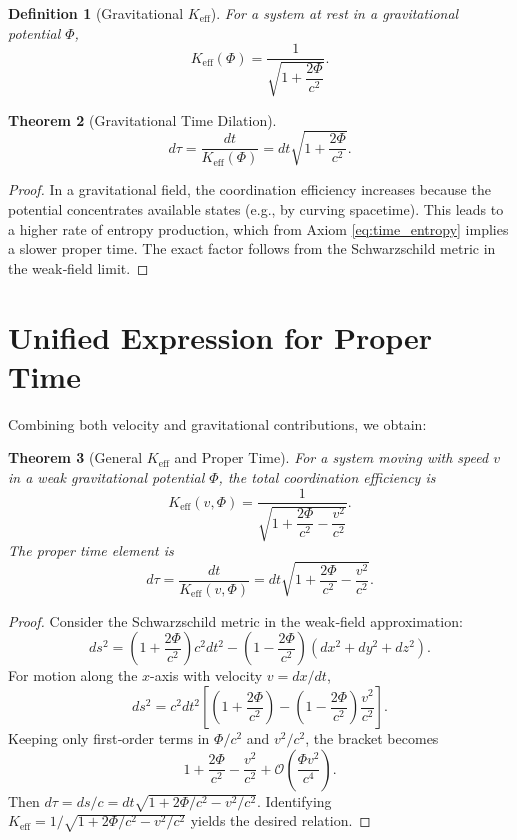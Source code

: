 \documentclass[12pt,a4paper]{article}
\newtheorem{theorem}{Theorem}[section]
\newtheorem{definition}[theorem]{Definition}
\newcommand{\Keff}{K_{\mathrm{eff}}}
\begin{document}
	\begin{definition}[Gravitational \(\Keff\)]
		For a system at rest in a gravitational potential \(\Phi\),
		\[
		\Keff(\Phi) = \frac{1}{\sqrt{1 + \dfrac{2\Phi}{c^2}}}.
		\]
	\end{definition}
	
	\begin{theorem}[Gravitational Time Dilation]
		\begin{equation}
			d\tau = \frac{dt}{\Keff(\Phi)} = dt\sqrt{1 + \frac{2\Phi}{c^2}}.
		\end{equation}
	\end{theorem}
	
	\begin{proof}
		In a gravitational field, the coordination efficiency increases because the potential concentrates available states (e.g., by curving spacetime). This leads to a higher rate of entropy production, which from Axiom \ref{eq:time_entropy} implies a slower proper time. The exact factor follows from the Schwarzschild metric in the weak‑field limit.
	\end{proof}
	
	\section{Unified Expression for Proper Time}
	\label{sec:unified}
	
	Combining both velocity and gravitational contributions, we obtain:
	
	\begin{theorem}[General \(\Keff\) and Proper Time]
		For a system moving with speed \(v\) in a weak gravitational potential \(\Phi\), the total coordination efficiency is
		\begin{equation}
			\Keff(v,\Phi) = \frac{1}{\sqrt{1 + \dfrac{2\Phi}{c^2} - \dfrac{v^2}{c^2}}}.
		\end{equation}
		The proper time element is
		\begin{equation}
			d\tau = \frac{dt}{\Keff(v,\Phi)} = dt\sqrt{1 + \frac{2\Phi}{c^2} - \frac{v^2}{c^2}}.
		\end{equation}
	\end{theorem}
	
	\begin{proof}
		Consider the Schwarzschild metric in the weak‑field approximation:
		\[
		ds^2 = \left(1+\frac{2\Phi}{c^2}\right)c^2 dt^2 - \left(1-\frac{2\Phi}{c^2}\right)(dx^2+dy^2+dz^2).
		\]
		For motion along the \(x\)-axis with velocity \(v = dx/dt\),
		\[
		ds^2 = c^2 dt^2\left[ \left(1+\frac{2\Phi}{c^2}\right) - \left(1-\frac{2\Phi}{c^2}\right)\frac{v^2}{c^2} \right].
		\]
		Keeping only first‑order terms in \(\Phi/c^2\) and \(v^2/c^2\), the bracket becomes
		\[
		1 + \frac{2\Phi}{c^2} - \frac{v^2}{c^2} + \mathcal{O}\left(\frac{\Phi v^2}{c^4}\right).
		\]
		Then \(d\tau = ds/c = dt\sqrt{1 + 2\Phi/c^2 - v^2/c^2}\). Identifying \(\Keff = 1/\sqrt{1 + 2\Phi/c^2 - v^2/c^2}\) yields the desired relation.
	\end{proof}
	
\end{document}
